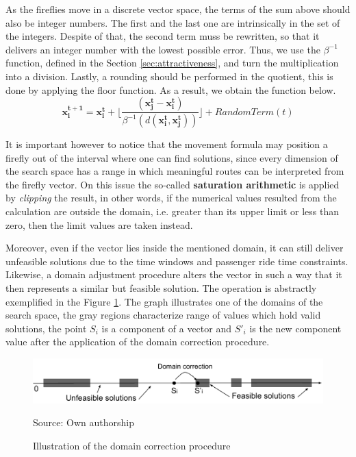 \documentclass[tuberlin,cic,tc,openright,english,noabntcite,oneside]{iiufrgs}
\begin{document}
As the fireflies move in a discrete vector space, the terms of the sum above should also be integer numbers. The first and the last one are intrinsically in the set of the integers. Despite of that, the second term muss be rewritten, so that it delivers an integer number with the lowest possible error. Thus, we use the $\beta^{-1}$ function, defined in the Section \ref{sec:attractiveness}, and turn the multiplication into a division. Lastly, a rounding should be performed in the quotient, this is done by applying the floor function. As a result, we obtain the function below.
$$\mathbf{x^{t+1}_i} = \mathbf{x^{t}_i} +  \lfloor \frac{(\mathbf{x^{t}_j} - \mathbf{x^{t}_i})}{\beta^{-1}(d(\mathbf{x^{t}_i}, \mathbf{x^{t}_j}))} \rfloor + RandomTerm(t)$$

It is important however to notice that the movement formula may position a firefly out of the interval where one can find solutions, since every dimension of the search space has a range in which meaningful routes can be interpreted from the firefly vector. On this issue the so-called \textbf{saturation arithmetic} is applied by \emph{clipping} the result, in other words, if the numerical values resulted from the calculation are outside the domain, i.e. greater than its upper limit or less than zero, then the limit values are taken instead.

Moreover, even if the vector lies inside the mentioned domain, it can still deliver unfeasible solutions due to the time windows and passenger ride time constraints. Likewise, a domain adjustment procedure alters the vector in such a way that it then represents a similar but feasible solution. The operation is abstractly exemplified in the Figure \ref{fig:solution_domain}. The graph illustrates one of the domains of the search space, the gray regions characterize range of values which hold valid solutions, the point $S_i$ is a component of a vector and $S'_i$ is the new component value after the application of the domain correction procedure.

\begin{figure}[H]
	\centering
    \caption{Illustration of the domain correction procedure}
    \includegraphics[width=\textwidth]{fig_solution_domain}\par
	Source: Own authorship
    \label{fig:solution_domain}
\end{figure}
\end{document}

